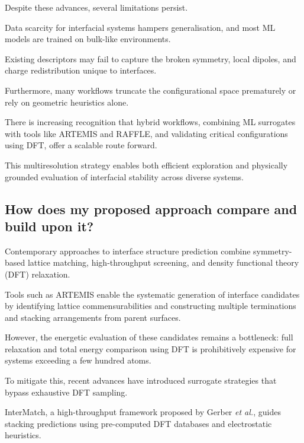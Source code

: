 
Despite these advances, several limitations persist.

Data scarcity for interfacial systems hampers generalisation, and most ML models are trained on bulk-like environments.

Existing descriptors may fail to capture the broken symmetry, local dipoles, and charge redistribution unique to
interfaces.

Furthermore, many workflows truncate the configurational space prematurely or rely on geometric heuristics alone.


There is increasing recognition that hybrid workflows, combining ML surrogates with tools like \textsc{ARTEMIS} and
\textsc{RAFFLE}, and validating critical configurations using DFT, offer a scalable route forward.

This multiresolution strategy enables both efficient exploration and physically grounded evaluation of interfacial
stability across diverse systems.


\subsection{How does my proposed approach compare and build upon it?}


Contemporary approaches to interface structure prediction combine symmetry-based lattice matching, high-throughput
screening, and density functional theory (DFT) relaxation.

Tools such as \textsc{ARTEMIS} enable the systematic generation of interface candidates by identifying lattice
commensurabilities and constructing multiple terminations and stacking arrangements from parent surfaces.

However, the energetic evaluation of these candidates remains a bottleneck: full relaxation and total energy comparison
using DFT is prohibitively expensive for systems exceeding a few hundred atoms.


To mitigate this, recent advances have introduced surrogate strategies that bypass exhaustive DFT sampling.

InterMatch, a high-throughput framework proposed by Gerber \textit{et al.}, guides stacking predictions using
pre-computed DFT databases and electrostatic heuristics.

